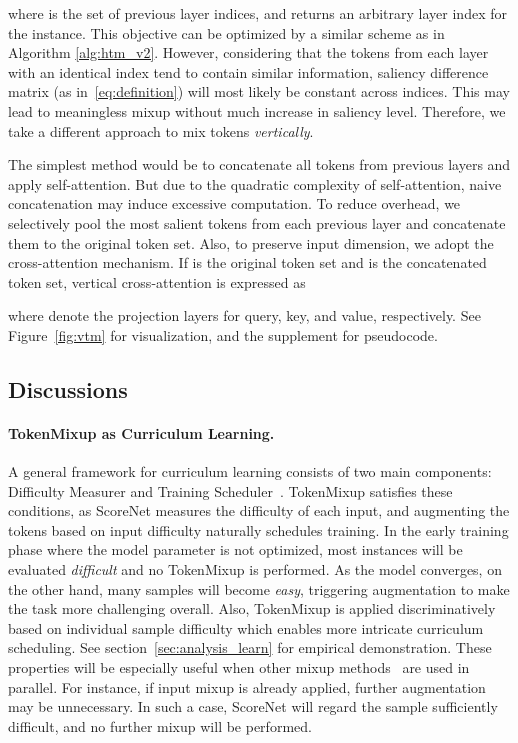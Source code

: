 \documentclass{article}
\begin{document}
where  is the set of previous layer indices, and  returns an arbitrary layer index for the  instance.
This objective can be optimized by a similar scheme as in Algorithm \ref{alg:htm_v2}.
However, considering that the tokens from each layer with an identical index tend to contain similar information, saliency difference matrix  (as in~\eqref{eq:definition}) will most likely be constant across indices.
This may lead to meaningless mixup without much increase in saliency level.
Therefore, we take a different approach to mix tokens \textit{vertically}.

The simplest method would be to concatenate all tokens from previous layers and apply self-attention.
But due to the quadratic complexity of self-attention, naive concatenation may induce excessive computation.
To reduce overhead, we selectively pool the  most salient tokens from each previous layer and concatenate them to the original token set.
Also, to preserve input dimension, we adopt the cross-attention mechanism.
If  is the original token set and  is the concatenated token set, vertical cross-attention is expressed as

where  denote the projection layers for query, key, and value, respectively.
See Figure~\ref{fig:vtm} for visualization, and the supplement for pseudocode. \subsection{Discussions}

\paragraph{TokenMixup as Curriculum Learning.}
A general framework for curriculum learning consists of two main components: Difficulty Measurer and Training Scheduler~\cite{wang2021survey}.
TokenMixup satisfies these conditions, as ScoreNet measures the difficulty of each input, and augmenting the tokens based on input difficulty naturally schedules training.
In the early training phase where the model parameter is not optimized, most instances will be evaluated \textit{difficult} and no TokenMixup is performed.
As the model converges, on the other hand, many samples will become \textit{easy}, triggering augmentation to make the task more challenging overall.
Also, TokenMixup is applied discriminatively based on individual sample difficulty which enables more intricate curriculum scheduling.
See section~\ref{sec:analysis_learn} for empirical demonstration.
These properties will be especially useful when other mixup methods~\cite{zhang2017mixup, yun2019cutmix, kim2020puzzle, kim2021co} are used in parallel.
For instance, if input mixup is already applied, further augmentation may be unnecessary.
In such a case, ScoreNet will regard the sample sufficiently difficult, and no further mixup will be performed. 
\end{document}
